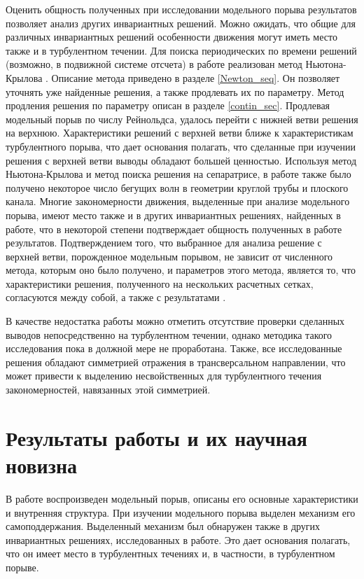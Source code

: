 Оценить общность полученных при исследовании модельного порыва результатов позволяет анализ других инвариантных решений. Можно ожидать, что общие для различных инвариантных решений особенности движения могут иметь место также и в турбулентном течении. Для поиска периодических по времени решений (возможно, в подвижной системе отсчета) в работе реализован метод Ньютона-Крылова \cite{Viswanath2007, Dijkstra2014}. Описание метода приведено в разделе \ref{Newton_seq}. Он позволяет уточнять уже найденные решения, а также продлевать их по параметру. Метод продления решения по параметру описан в разделе \ref{contin_sec}. Продлевая модельный порыв по числу Рейнольдса, удалось перейти с нижней ветви решения на верхнюю. Характеристики решений с верхней ветви ближе к характеристикам турбулентного порыва, что дает основания полагать, что сделанные при изучении решения с верхней ветви выводы обладают большей ценностью. Используя метод Ньютона-Крылова и метод поиска решения на сепаратрисе, в работе также было получено некоторое число бегущих волн в геометрии круглой трубы и плоского канала. Многие закономерности движения, выделенные при анализе модельного порыва, имеют место также и в других инвариантных решениях, найденных в работе, что в некоторой степени подтверждает общность полученных в работе результатов. Подтверждением того, что выбранное для анализа решение с верхней ветви, порожденное модельным порывом, не зависит от численного метода, которым оно было получено, и параметров этого метода, является то, что характеристики решения, полученного на нескольких расчетных сетках, согласуются между собой, а также с результатами \cite{Avila2013}. 

В качестве недостатка работы можно отметить отсутствие проверки сделанных выводов непосредственно на турбулентном течении, однако методика такого исследования пока в должной мере не проработана. Также, все исследованные решения обладают симметрией отражения в трансверсальном направлении, что может привести к выделению несвойственных для турбулентного течения закономерностей, навязанных этой симметрией. 


\section{Результаты работы и их научная новизна}

В работе воспроизведен модельный порыв, описаны его основные характеристики и внутренняя структура. При изучении модельного порыва выделен механизм его самоподдержания. Выделенный механизм был обнаружен также в других инвариантных решениях, исследованных в работе. Это дает основания полагать, что он имеет место в турбулентных течениях и, в частности, в турбулентном порыве.

